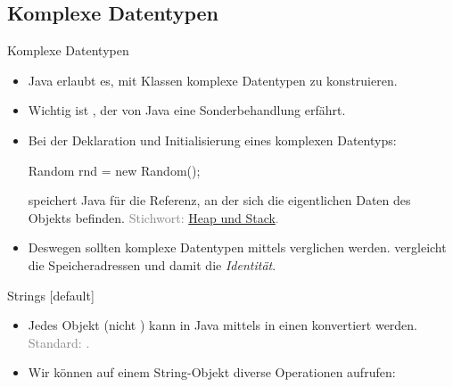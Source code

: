 \subsection{Komplexe Datentypen}

\begin{frame}[fragile]{Komplexe Datentypen}
    \begin{itemize}[<+(1)->]
        \widei
        \item Java erlaubt es, mit Klassen komplexe Datentypen zu konstruieren.
        \item Wichtig ist , der von Java eine Sonderbehandlung erfährt.
        \item Bei der Deklaration und Initialisierung eines komplexen Datentyps:\pause{}
\begin{plainjava}
Random rnd = new Random();
\end{plainjava}
        \pause{}speichert Java für  die Referenz,\pause{} an der sich die eigentlichen Daten des Objekts befinden. \textcolor{gray}{Stichwort: \hyperlink{mrk:heap-and-stack}{Heap und Stack}.}
        \item Deswegen sollten komplexe Datentypen mittels  verglichen werden.\pause{} \say{\bjava{==}} vergleicht die Speicheradressen und damit die \emph{Identität}.
    \end{itemize}
\end{frame}

\begin{frame}{Strings}
    [default]%
    \begin{itemize}[<+(1)->]
        \widei
        \item Jedes Objekt  (nicht ) kann in Java mittels  in einen  konvertiert werden. \textcolor{gray}{Standard: .}
        \item Wir können auf einem String-Objekt diverse Operationen aufrufen: 
    \end{itemize}
\end{frame}

